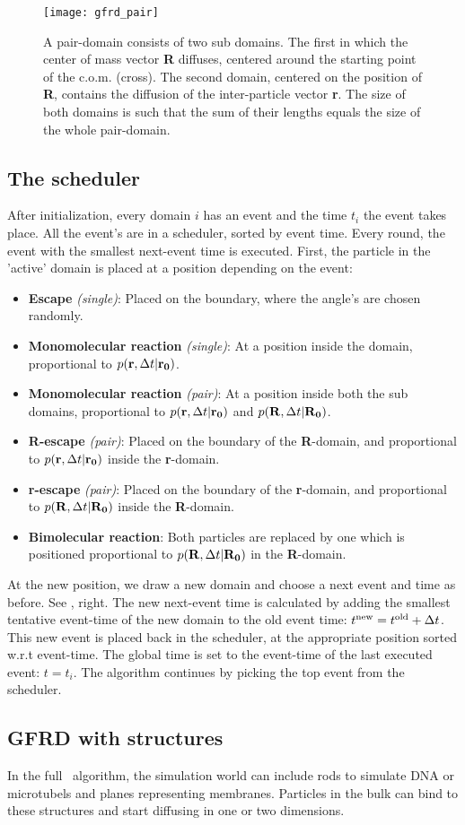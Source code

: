 \begin{figure}[ht]
\centering
\texttt{[image: gfrd\_pair]}
\caption{ A pair-domain consists of two sub domains. The first in which the center of mass vector {\bf R} diffuses, centered around the starting point of the c.o.m. (cross). The second domain, centered on the position of {\bf R}, contains the diffusion of the inter-particle vector {\bf r}. The size of both domains is such that the sum of their lengths equals the size of the whole pair-domain. }
\end{figure}

\subsection{The scheduler}
After initialization, every domain $i$ has an event and the time $t_i$ the event takes place. All the event's are in a scheduler, sorted by event time. Every round, the event with the smallest next-event time is executed. First, the particle in the 'active' domain is placed at a position depending on the event: 
\begin{itemize}
 \item {\bf Escape} {\it (single)}: Placed on the boundary, where the angle's are chosen randomly.
 \item {\bf Monomolecular reaction} {\it (single)}: At a position inside the domain, proportional to $p({\bf r},\Delta t|{\bf r_0})$.
 \item {\bf Monomolecular reaction} {\it (pair)}: At a position inside both the sub domains, proportional to $p({\bf r},\Delta t|{\bf r_0})$ and $p({\bf R},\Delta t|{\bf R_0})$.
 \item {\bf R-escape} {\it (pair)}: Placed on the boundary of the {\bf R}-domain, and proportional to $p({\bf r},\Delta t|{\bf r_0})$ inside the {\bf r}-domain.
 \item {\bf r-escape} {\it (pair)}: Placed on the boundary of the {\bf r}-domain, and proportional to $p({\bf R},\Delta t|{\bf R_0})$ inside the {\bf R}-domain. 
 \item {\bf Bimolecular reaction}: Both particles are replaced by one which is positioned proportional to $p({\bf R},\Delta t|{\bf R_0})$ in the {\bf R}-domain.
\end{itemize}
At the new position, we draw a new domain and choose a next event and time as before. See , right. The new next-event time is calculated by adding the smallest tentative event-time of the new domain to the old event time: $t^{\rm new} =  t^{\rm old} + \Delta t$. This new event is placed back in the scheduler, at the appropriate position sorted w.r.t event-time. The global time is set to the event-time of the last executed event: $t=t_i$. The algorithm continues by picking the top event from the scheduler.

\subsection{GFRD with structures}
In the full \GFRD\ algorithm, the simulation world can include rods to simulate DNA or microtubels and planes representing membranes. Particles in the bulk can bind to these structures and start diffusing in one or two dimensions.